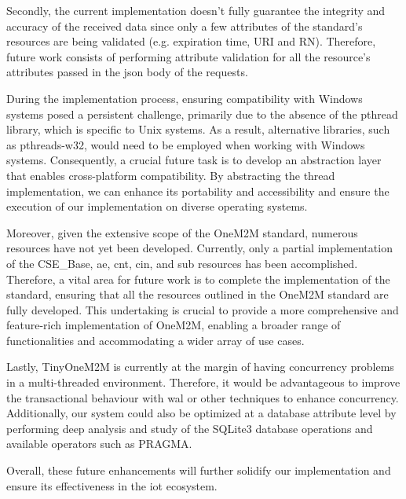 \documentclass[a4paper,fleqn]{cas-dc}
\begin{document}
Secondly, the current implementation doesn't fully guarantee the integrity and accuracy of the received data since only a few attributes of the standard's resources are being validated (e.g. expiration time, URI and RN). Therefore, future work consists of performing attribute validation for all the resource's attributes passed in the \gls{json} body of the requests.

During the implementation process, ensuring compatibility with Windows systems posed a persistent challenge, primarily due to the absence of the pthread library, which is specific to Unix systems. As a result, alternative libraries, such as pthreads-w32, would need to be employed when working with Windows systems. Consequently, a crucial future task is to develop an abstraction layer that enables cross-platform compatibility. By abstracting the thread implementation, we can enhance its portability and accessibility and ensure the execution of our implementation on diverse operating systems.

Moreover, given the extensive scope of the OneM2M standard, numerous resources have not yet been developed. Currently, only a partial implementation of the CSE\_Base, \gls{ae}, \gls{cnt}, \gls{cin}, and \gls{sub} resources has been accomplished. Therefore, a vital area for future work is to complete the implementation of the standard, ensuring that all the resources outlined in the OneM2M standard are fully developed. This undertaking is crucial to provide a more comprehensive and feature-rich implementation of OneM2M, enabling a broader range of functionalities and accommodating a wider array of use cases.

Lastly, TinyOneM2M is currently at the margin of having concurrency problems in a multi-threaded environment. Therefore, it would be advantageous to improve the transactional behaviour with \gls{wal} or other techniques to enhance concurrency. Additionally, our system could also be optimized at a database attribute level by performing deep analysis and study of the SQLite3 database operations and available operators such as PRAGMA.

Overall, these future enhancements will further solidify our implementation and ensure its effectiveness in the \gls{iot} ecosystem.


%
%



\end{document}
